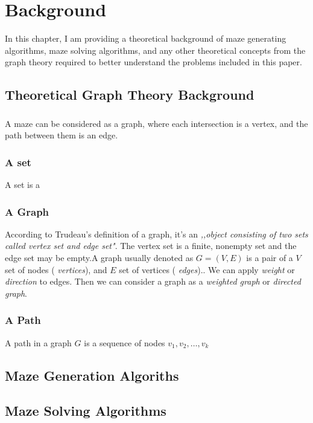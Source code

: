 \chapter{Background}\label{cha:background}

In this chapter, I am providing a theoretical background of maze generating algorithms, maze solving algorithms, and any other theoretical concepts from the graph theory required to better understand the problems included in this paper. 

\section{Theoretical Graph Theory Background}\label{sec:theoreticalBackground}
\subsection{}
A maze can be considered as a graph, where each intersection is a vertex, and the path between them is an edge. 
\subsection{ A set}
A set is a 
\subsection{A Graph}
According to Trudeau's definition\cite{1} of a graph, it's an \textit{,,object consisting of two sets called vertex set and edge set"}. 
The vertex set is a finite, nonempty set and the edge set may be empty.A graph usually denoted as $ G = (V, E)$ is a pair of a $V$ set of nodes
 ( \textit{vertices}), and $E$ set of vertices ( \textit{edges}).\cite{2}. We can apply \textit{weight} or \textit{direction} to edges. 
 Then we can consider a graph as a \textit{ weighted graph} or \textit{directed graph}.

\subsection{A Path}
A path in a graph $G$ is a sequence of nodes $v_1, v_2,\ldots,v_k$
\section{Maze Generation Algoriths}
\section{Maze Solving Algorithms}
